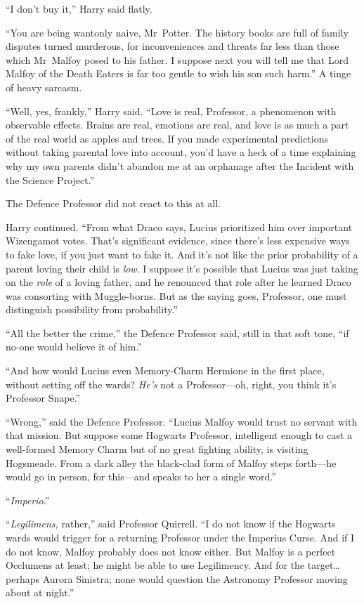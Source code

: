 “I don’t buy it,” Harry said flatly.

“You are being wantonly naive, Mr~Potter. The history books are full of family disputes turned murderous, for inconveniences and threats far less than those which Mr~Malfoy posed to his father. I suppose next you will tell me that Lord Malfoy of the Death Eaters is far too gentle to wish his son such harm.” A tinge of heavy sarcasm.

“Well, yes, frankly,” Harry said. “Love is real, Professor, a phenomenon with observable effects. Brains are real, emotions are real, and love is as much a part of the real world as apples and trees. If you made experimental predictions without taking parental love into account, you’d have a heck of a time explaining why my own parents didn’t abandon me at an orphanage after the Incident with the Science Project.”

The Defence Professor did not react to this at all.

Harry continued. “From what Draco says, Lucius prioritized him over important Wizengamot votes. That’s significant evidence, since there’s less expensive ways to fake love, if you just want to fake it. And it’s not like the prior probability of a parent loving their child is \emph{low}. I suppose it’s possible that Lucius was just taking on the \emph{role} of a loving father, and he renounced that role after he learned Draco was consorting with Muggle-borns. But as the saying goes, Professor, one must distinguish possibility from probability.”

“All the better the crime,” the Defence Professor said, still in that soft tone, “if no-one would believe it of him.”

“And how would Lucius even Memory-Charm Hermione in the first place, without setting off the wards? \emph{He’s} not a Professor—oh, right, you think it’s Professor Snape.”

“Wrong,” said the Defence Professor. “Lucius Malfoy would trust no servant with that mission. But suppose some Hogwarts Professor, intelligent enough to cast a well-formed Memory Charm but of no great fighting ability, is visiting Hogsmeade. From a dark alley the black-clad form of Malfoy steps forth—he would go in person, for this—and speaks to her a single word.”

“\emph{Imperio}.”

“\emph{Legilimens,} rather,” said Professor Quirrell. “I do not know if the Hogwarts wards would trigger for a returning Professor under the Imperius Curse. And if I do not know, Malfoy probably does not know either. But Malfoy is a perfect Occlumens at least; he might be able to use Legilimency. And for the target…perhaps Aurora Sinistra; none would question the Astronomy Professor moving about at night.”


